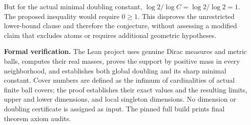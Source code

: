 \documentclass[11pt]{article}
\begin{document}
But for the actual minimal doubling constant, \(\log2/\log C=\log2/\log2=1\). The proposed inequality would require \(0\ge1\). This disproves the unrestricted lower-bound clause and therefore the conjecture, without assessing a modified claim that excludes atoms or requires additional geometric hypotheses.

\medskip\noindent\textbf{Formal verification.} The Lean project uses genuine Dirac measures and metric balls, computes their real masses, proves the support by positive mass in every neighborhood, and establishes both global doubling and its sharp minimal constant. Cover numbers are defined as the infimum of cardinalities of actual finite ball covers; the proof establishes their exact values and the resulting limits, upper and lower dimensions, and local singleton dimensions. No dimension or doubling certificate is assigned as input. The pinned full build prints final theorem axiom audits.
\end{document}
